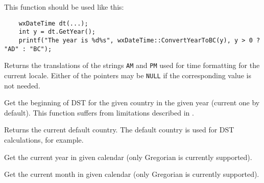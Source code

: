 This function should be used like this:

\begin{verbatim}
    wxDateTime dt(...);
    int y = dt.GetYear();
    printf("The year is %d%s", wxDateTime::ConvertYearToBC(y), y > 0 ? "AD" : "BC");
\end{verbatim}

\label{wxdatetimegetampmstrings}


Returns the translations of the strings {\tt AM} and {\tt PM} used for time
formatting for the current locale. Either of the pointers may be {\tt NULL} if
the corresponding value is not needed.

\label{wxdatetimegetbegindst}


Get the beginning of DST for the given country in the given year (current one
by default). This function suffers from limitations described in
.



\label{wxdatetimegetcountry}


Returns the current default country. The default country is used for DST
calculations, for example.



\label{wxdatetimegetcurrentyear}


Get the current year in given calendar (only Gregorian is currently supported).

\label{wxdatetimegetcurrentmonth}


Get the current month in given calendar (only Gregorian is currently supported).

